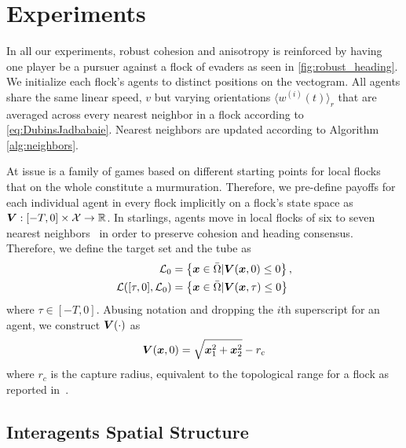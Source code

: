\section{Experiments}
\label{sec:expts}
%
In all our experiments, robust cohesion and anisotropy is reinforced by having one player be a pursuer against a flock of evaders as seen in \autoref{fig:robust_heading}. We initialize each flock's agents to distinct positions on the vectogram. All agents share the same linear speed, $v$ but varying orientations $\langle w^{(i)} (t) \rangle_r$ that are averaged across every nearest neighbor in a flock according to \eqref{eq:DubinsJadbabaie}. Nearest neighbors are updated according to Algorithm \ref{alg:neighbors}.
%

At issue is a family of games based on different starting points for local flocks that on the whole constitute a murmuration. Therefore, we pre-define payoffs for each individual agent in every flock implicitly on a flock's state space as $\bm{V}: [-T, 0]\times \mathcal{X} \rightarrow \mathbb{R}$. 
%
In starlings, agents move in local flocks of six to seven nearest neighbors~\cite{Ballerini1232} in order to preserve cohesion and heading consensus. Therefore, we define the target set and the tube as
%
\begin{align}
	\mathcal{L}_0 &= \left\{ \bm{x} \in \bar{\Omega} | \bm{V}(\bm{x}, 0) \le 0 \right\}, \\
	\mathcal{L}([\tau, 0],  \mathcal{L}_0) &= \left\{\bm{x}\in \bar{\Omega}  | \bm{V}(\bm{x}, \tau) \le 0\right\}
\end{align}
%
where $\tau \in  [-T, 0]$. Abusing notation and dropping the $i$th superscript for an agent, we construct $\bm{V}(\cdot)$ as 
%
\begin{align}
	\bm{V}(\bm{x}, 0) = \sqrt{\bm{x}_1^2 + \bm{x}_2^2} - r_c
\end{align}
%
where $r_c$ is the capture radius, equivalent to the topological range for a flock as reported in~\cite{Ballerini1232}. 


\subsection{Interagents Spatial Structure}

